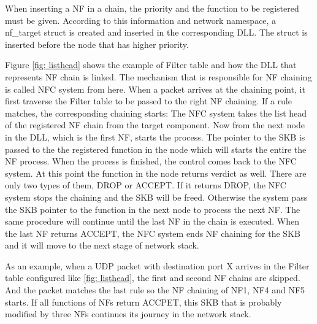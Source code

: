  When inserting a NF in a chain, the priority and the function to be registered must be given. According to this information and network namespace, a nf\_target struct is created and inserted in the corresponding DLL. The struct is inserted before the node that has higher priority. 
 
 Figure \ref{fig: listhead} shows the example of Filter table and how the DLL that represents NF chain is linked. The mechanism that is responsible for NF chaining is called NFC system from here. When a packet arrives at the chaining point, it first traverse the Filter table to be passed to the right NF chaining. If a rule matches, the corresponding chaining starts: The NFC system takes the list head of the registered NF chain from the target component. Now from the next node in the DLL, which is the first NF, starts the process. The pointer to the SKB is passed to the the registered function in the node which will starts the entire the NF process. When the process is finished, the control comes back to the NFC system. At this point the function in the node returns verdict as well. There are only two types of them, DROP or ACCEPT. If it returns DROP, the NFC system stops the chaining and the SKB will be freed. Otherwise the system pass the SKB pointer to the function in the next node to process the next NF. The same procedure will continue until the last NF in the chain is executed. When the last NF returns ACCEPT, the NFC system ends NF chaining for the SKB and it will move to the next stage of network stack. 

As an example, when a UDP packet with destination port X arrives in the Filter table configured like \ref{fig: listhead}, the first and second NF chains are skipped. And the packet matches the last rule so the NF chaining of NF1, NF4 and NF5 starts. If all functions of NFs return ACCPET, this SKB that is probably modified by three NFs continues its journey in the network stack. 
